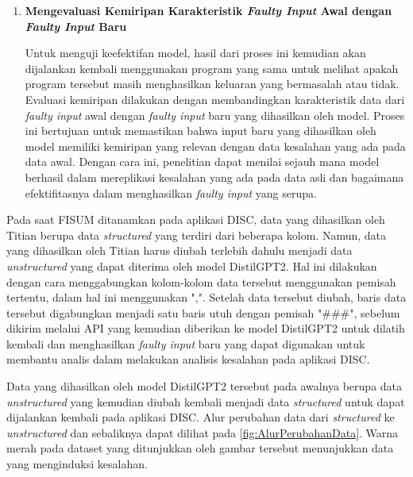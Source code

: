 \begin{enumerate}[topsep=0pt]
    \item \textbf{Mengevaluasi Kemiripan Karakteristik 
    \emph{Faulty Input} Awal dengan \emph{Faulty Input} 
    Baru}

    Untuk menguji keefektifan model, hasil dari proses 
    ini kemudian akan dijalankan kembali menggunakan 
    program yang sama untuk melihat apakah program 
    tersebut masih menghasilkan keluaran yang bermasalah 
    atau tidak. Evaluasi kemiripan dilakukan dengan 
    membandingkan karakteristik data dari 
    \emph{faulty input} awal dengan \emph{faulty input}
    baru yang dihasilkan oleh model. Proses ini 
    bertujuan untuk memastikan bahwa input baru 
    yang dihasilkan oleh model memiliki kemiripan 
    yang relevan dengan data kesalahan yang ada 
    pada data awal. Dengan cara ini, penelitian 
    dapat menilai sejauh mana model berhasil dalam 
    mereplikasi kesalahan yang ada pada data asli 
    dan bagaimana efektifitasnya dalam menghasilkan 
    \emph{faulty input} yang serupa.

  \end{enumerate}
  
  Pada saat FISUM ditanamkan pada aplikasi DISC, 
  data yang dihasilkan oleh Titian berupa data 
  \emph{structured} yang terdiri dari beberapa kolom. 
  Namun, data yang dihasilkan oleh Titian harus
  diubah terlebih dahulu menjadi data \emph{unstructured}
  yang dapat diterima oleh model DistilGPT2.
  Hal ini dilakukan dengan cara menggabungkan
  kolom-kolom data tersebut menggunakan pemisah
  tertentu, dalam hal ini menggunakan ",".
  Setelah data tersebut diubah, baris data tersebut
  digabungkan menjadi satu baris utuh dengan pemisah "\#\#\#",
  sebelum dikirim melalui API yang
  kemudian diberikan ke model DistilGPT2 untuk
  dilatih kembali dan menghasilkan \emph{faulty input}
  baru yang dapat digunakan untuk membantu analis
  dalam melakukan analisis kesalahan pada aplikasi DISC.
  
  Data yang dihasilkan oleh model DistilGPT2 tersebut
  pada awalnya berupa data \emph{unstructured} yang
  kemudian diubah kembali menjadi data \emph{structured}
  untuk dapat dijalankan kembali pada aplikasi DISC.
  Alur perubahan data dari \emph{structured} ke \emph{unstructured}
  dan sebaliknya dapat dilihat pada \ref{fig:AlurPerubahanData}.
  Warna merah pada dataset yang ditunjukkan oleh gambar
  tersebut menunjukkan data yang menginduksi kesalahan.

